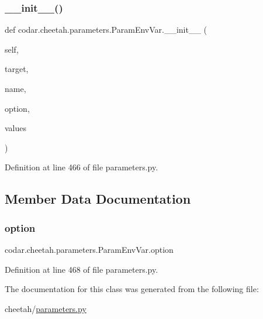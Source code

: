 \subsubsection{\texorpdfstring{\+\_\+\+\_\+init\+\_\+\+\_\+()}{\_\_init\_\_()}}
{\footnotesize\ttfamily def codar.\+cheetah.\+parameters.\+Param\+Env\+Var.\+\_\+\+\_\+init\+\_\+\+\_\+ (\begin{DoxyParamCaption}\item[{}]{self,  }\item[{}]{target,  }\item[{}]{name,  }\item[{}]{option,  }\item[{}]{values }\end{DoxyParamCaption})}



Definition at line 466 of file parameters.\+py.



\subsection{Member Data Documentation}
\mbox{\label{classcodar_1_1cheetah_1_1parameters_1_1_param_env_var_acb91e037a8f36b24a8588b808ad70444}} 
\subsubsection{\texorpdfstring{option}{option}}
{\footnotesize\ttfamily codar.\+cheetah.\+parameters.\+Param\+Env\+Var.\+option}



Definition at line 468 of file parameters.\+py.



The documentation for this class was generated from the following file\+:\begin{DoxyCompactItemize}
\item 
cheetah/\hyperlink{parameters_8py}{parameters.\+py}\end{DoxyCompactItemize}
